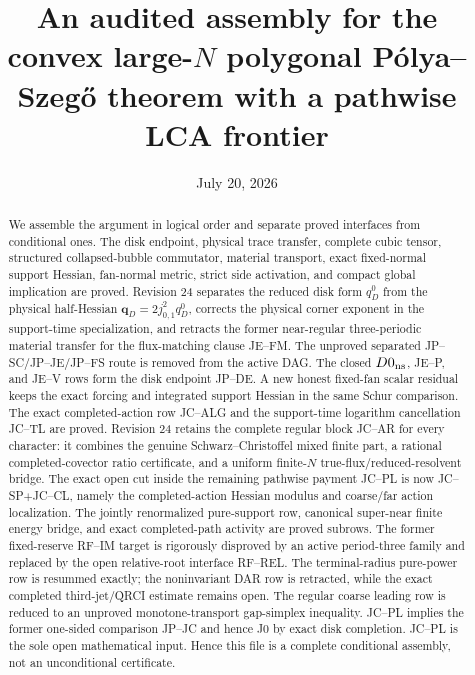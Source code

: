 \documentclass[11pt]{amsart}
\title[Audited convex large-$N$ polygonal assembly]
{An audited assembly for the convex large-$N$ polygonal
P\'olya--Szeg\H{o} theorem with a pathwise LCA frontier}
\author{}
\date{July 20, 2026}
\begin{document}
\begin{abstract}
We assemble the argument in logical order and separate proved interfaces
from conditional ones.  The disk endpoint, physical trace transfer,
complete cubic tensor, structured collapsed-bubble commutator, material
transport, exact fixed-normal support Hessian, fan-normal metric, strict
side activation, and compact global implication are proved.  Revision 24
separates the reduced disk form $q_D^0$ from the physical half-Hessian
$\mathbf q_D=2j_{0,1}^2q_D^0$, corrects the physical corner exponent in
the support-time specialization, and retracts the former near-regular
three-periodic material transfer for the flux-matching clause JE--FM.
The unproved separated JP--SC/JP--JE/JP--FS route is removed from the
active DAG.  The closed $D0_{\rm ns}$, JE--P, and JE--V
rows form the disk endpoint JP--DE.  A new honest fixed-fan scalar residual
keeps the exact forcing and integrated support Hessian in the same Schur
comparison.  The exact completed-action row JC--ALG and the support-time
logarithm cancellation JC--TL are proved.  Revision 24 retains the complete
regular block JC--AR for every character: it combines the genuine
Schwarz--Christoffel mixed finite part, a rational completed-covector ratio
certificate, and a uniform finite-$N$ true-flux/reduced-resolvent bridge.
The exact open cut inside the remaining pathwise payment JC--PL is now
JC--SP$+$JC--CL, namely the completed-action Hessian modulus and coarse/far
action localization.  The jointly renormalized pure-support row, canonical
super-near finite energy bridge, and exact completed-path activity are
proved subrows.  The former fixed-reserve RF--IM target is rigorously
disproved by an active period-three family and replaced by the open
relative-root interface RF--REL.  The terminal-radius pure-power row is
resummed exactly; the noninvariant DAR row is retracted, while the exact
completed third-jet/QRCI estimate remains open.  The regular coarse leading
row is reduced to an unproved monotone-transport gap-simplex inequality.
JC--PL implies the former one-sided comparison
JP--JC and hence J0 by exact disk completion.  JC--PL is the sole open
mathematical input.  Hence this file is a complete conditional assembly,
not an unconditional certificate.
\end{abstract}

\maketitle
\tableofcontents
\end{document}

